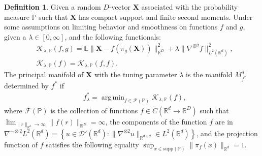 \documentclass[11pt,reqno]{article}
\DeclareMathOperator*{\argmin}{arg\,min}
\theoremstyle{definition}
\newtheorem{definition}{Definition}
\begin{document}
\begin{definition}
  \label{def:principal_manifolds}
  Given a random $D$-vector $\boldsymbol{X}$ associated with the probability measure $\mathbb{P}$ such that $\boldsymbol{X}$ has compact support and finite second moments. Under some assumptions on limiting behavior and smoothness on functions $f$ and  $g$, given a $\lambda \in [0, \infty]$, and the following functionals:
  \begin{align}\label{eq:5}
&\mathcal{K}_{\lambda, \mathbb{P}}(f, g) = \mathbb{E}\|\boldsymbol{X} - f(\pi_g(\boldsymbol{X}))\|_{\mathbb{R}^{D}}^2 + \lambda\|\nabla^{\otimes 2}f\|_{L^2(\mathbb{R}^{d})}^2, \\
&\mathcal{K}_{\lambda, \mathbb{P}}(f) = \mathcal{K}_{\lambda, \mathbb{P}}(f, f). \nonumber
  \end{align}
  The principal manifold of $\boldsymbol{X}$ with the tuning parameter $\lambda$ is the manifold $M_{f^{*}}^{d}$ determined by $f^{*}$ if 
  \begin{equation}\nonumber
    \begin{aligned}
        & f_{\lambda}^{*} = \argmin_{f \in \mathcal{F}(\mathbb{P})}\mathcal{K}_{\lambda, \mathbb{P}}(f),
    \end{aligned}
  \end{equation}
where $\mathcal{F}(\mathbb{P})$ is the collection of functions $f \in C(\mathbb{R}^{d} \to \mathbb{R}^{D})$ such that $\lim_{\|r\|_{\mathbb{R}^{d}} \to \infty}\|f(r)\|_{\mathbb{R}^{D}} = \infty$, the components of the function $f$ are in $\nabla^{-\otimes 2}L^2(\mathbb{R}^{d}) = \left\{u \in \mathcal{D}'(\mathbb{R}^{d}): \|\nabla^{\otimes 2} u\|_{\mathbb{R}^{d \times d}} \in L^2(\mathbb{R}^{d})\right\}$, and the projection function of $f$ satisfies the following equality $\sup_{x \in \text{supp}(\mathbb{P})}\|\pi_f(x)\|_{\mathbb{R}^{d}} = 1$. 
\end{definition}
\end{document}
